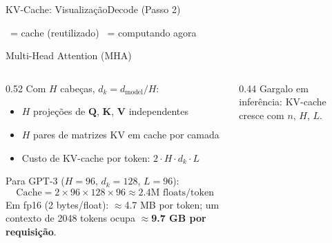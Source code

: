 \documentclass[aspectratio=169, xcolor=dvipsnames]{beamer}
\begin{document}
\begin{frame}{KV-Cache: Visualização}{Decode (Passo 2)}
\begin{center}
    \end{center}
    {\footnotesize \colorbox{CellGreen}{\,} = cache (reutilizado) \quad \colorbox{CellYellow}{\,} = computando agora}
  \end{frame}

  \begin{frame}{Multi-Head Attention (MHA)}
    \begin{columns}[T]
      \begin{column}{0.52\textwidth}
        Com $H$ cabeças, $d_k = d_\text{model}/H$:
        \begin{itemize}
          \item $H$ projeções de $\mathbf{Q}$, $\mathbf{K}$, $\mathbf{V}$ independentes
          \item $H$ pares de matrizes KV em cache por camada
          \item Custo de KV-cache por token: $2 \cdot H \cdot d_k \cdot L$
        \end{itemize}
        \vspace{0.3em}
        Para GPT-3 ($H=96$, $d_k=128$, $L=96$):
        \[
          \text{Cache} = 2 \times 96 \times 128 \times 96 \approx 2.4\text{M floats/token}
        \]
        Em fp16 (2 bytes/float): $\approx$4.7 MB por token; um contexto de 2048 tokens ocupa $\approx$\textbf{9.7 GB por requisição}.
      \end{column}
      \begin{column}{0.44\textwidth}
        \vspace{0.3em}
        Gargalo em inferência: KV-cache cresce com $n$, $H$, $L$.
      \end{column}
    \end{columns}
  \end{frame}
\end{document}
